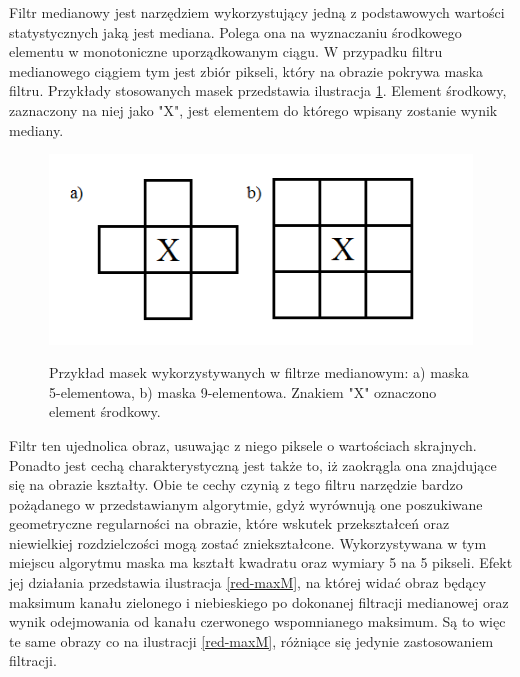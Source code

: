 Filtr medianowy jest narzędziem wykorzystujący jedną z podstawowych wartości statystycznych jaką jest mediana. Polega ona na wyznaczaniu środkowego elementu w monotoniczne uporządkowanym ciągu\cite{Malina}. W przypadku filtru medianowego ciągiem tym jest zbiór pikseli, który na obrazie pokrywa maska filtru. Przykłady stosowanych masek przedstawia ilustracja \ref{maski}. Element środkowy, zaznaczony na niej jako "X", jest elementem do którego wpisany zostanie wynik mediany.\newpage
\begin{figure}[H]
\begin{center}
\includegraphics[scale=0.8]{imgs/maski.png}
\caption[Przykład masek filtru medianowego.]\small{Przykład masek wykorzystywanych w filtrze medianowym: a) maska 5-elementowa, b) maska 9-elementowa. Znakiem "X" oznaczono element środkowy.}
\label{maski}
\end{center}
\end{figure}
Filtr ten ujednolica obraz, usuwając z niego piksele o wartościach skrajnych. Ponadto jest cechą charakterystyczną jest także to, iż zaokrągla ona znajdujące się na obrazie kształty. Obie te cechy czynią z tego filtru narzędzie bardzo pożądanego w przedstawianym algorytmie, gdyż wyrównują one poszukiwane geometryczne regularności na obrazie, które wskutek przekształceń oraz niewielkiej rozdzielczości mogą zostać zniekształcone. Wykorzystywana w tym miejscu algorytmu maska ma kształt kwadratu oraz wymiary 5 na 5 pikseli. Efekt jej działania przedstawia ilustracja \ref{red-maxM}, na której widać obraz będący maksimum kanału zielonego i niebieskiego po dokonanej filtracji medianowej oraz wynik odejmowania od kanału czerwonego wspomnianego maksimum. Są to więc te same obrazy co na ilustracji \ref{red-maxM}, różniące się jedynie zastosowaniem filtracji.
